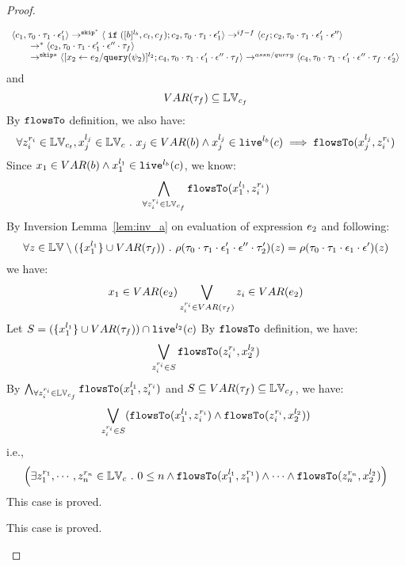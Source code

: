 {\begin{proof}
\begin{subproof}
\begin{enumerate}
\begin{enumerate}
\[
    \begin{array}{l}   
  \langle c_1, \mathtt{\tau}_0 \cdot \mathtt{\tau}_1 \cdot \mathtt{\epsilon}_1' \rangle 
  \rightarrow^{\mathtt{skip}^*} 
  \langle \;\mathtt{if}\; ([b]^{l_b}, c_t, c_f); {c}_2, \mathtt{\tau}_0 \cdot \mathtt{\tau}_1 \cdot \mathtt{\epsilon}_1' \rangle 
  \rightarrow^{if-f} 
  \langle c_f;c_2, \mathtt{\tau}_0 \cdot \mathtt{\tau}_1 \cdot \mathtt{\epsilon}_1' \cdot \mathtt{\epsilon}'' \rangle 
  \\
  \qquad \rightarrow^{*} 
  \langle c_2, 
  \mathtt{\tau}_0 \cdot \mathtt{\tau}_1 \cdot \mathtt{\epsilon}_1' \cdot \mathtt{\epsilon}'' \cdot \mathtt{\tau}_f \rangle
  \\
  \qquad \rightarrow^{\mathtt{skip}*} 
  \langle [\mathrel{ {x}_2 \leftarrow e_2 / {\tt query}(\psi_2) }]^{l_2};{c}_4, 
  \mathtt{\tau}_0 \cdot \mathtt{\tau}_1 \cdot \mathtt{\epsilon}_1' \cdot \mathtt{\epsilon}'' \cdot \mathtt{\tau}_f \rangle
  \rightarrow^{assn/query} 
  \langle {c}_4,  \mathtt{\tau}_0 \cdot \mathtt{\tau}_1 \cdot \mathtt{\epsilon}_1' \cdot \mathtt{\epsilon}'' \cdot \mathtt{\tau}_f \cdot \mathtt{\epsilon}_2' \rangle 
\end{array}
\]
and 
\[
  VAR{(\mathtt{\tau}_f)} \subseteq \mathbb{LV}_{c_f}
\]
%
By $\mathtt{flowsTo}$ definition, we also have:
\[
  \forall z_i^{r_i} \in \mathbb{LV}_{c_t},  x_j^{l_j} \in \mathbb{LV}_c ~.~ 
  x_j \in VAR(b) \land x_j^{l_j} \in \mathtt{live}^{l_b}(c) \implies
  \mathtt{flowsTo}(x_j^{l_j}, z_i^{r_i})
\]
Since $x_1 \in VAR(b) \land x_1^{l_1} \in \mathtt{live}^{l_b}(c)$, we know: 
\[
  \bigwedge_{\forall z_i^{r_i} \in \mathbb{LV}_{c_f}}
  \mathtt{flowsTo}(x_1^{l_1}, z_i^{r_i})
\]
%
By Inversion Lemma~\ref{lem:inv_a} on evaluation of expression $e_2$ and following: 
\[
  \forall z \in \mathbb{LV} \setminus (\{x_1^{l_1}\} \cup VAR{(\mathtt{\tau}_f)}) ~.~
  \rho(\mathtt{\tau}_0 \cdot \mathtt{\tau}_1 \cdot \mathtt{\epsilon}_1'\cdot \mathtt{\epsilon}'' \cdot \mathtt{\tau}_2')(z) 
  = \rho(\mathtt{\tau}_0 \cdot \mathtt{\tau}_1 \cdot \mathtt{\epsilon}_1\cdot \mathtt{\epsilon}')(z)
\]
%
we have:
\[
  x_1 \in VAR(e_2) \bigvee_{z_i^{r_i} \in VAR{(\mathtt{\tau}_f)}} z_i \in VAR(e_2)
\]
%
Let $S = (\{x_1^{l_1}\} \cup VAR{(\mathtt{\tau}_f)}) \cap \mathtt{live}^{l_2}(c) $
%
By $\mathtt{flowsTo}$ definition, we have:
\[
   \bigvee_{z_i^{r_i} \in S}  \mathtt{flowsTo}(z_i^{r_i}, x_2^{l_2})
\]
By $ \bigwedge_{\forall z_i^{r_i} \in \mathbb{LV}_{c_f}} \mathtt{flowsTo}(x_1^{l_1}, z_i^{r_i})$ and $S \subseteq VAR{(\mathtt{\tau}_f)} \subseteq \mathbb{LV}_{c_f}$, we have:
\[
\bigvee_{z_i^{r_i} \in S} 
(\mathtt{flowsTo}(x_1^{l_1}, z_i^{r_i}) \land \mathtt{flowsTo}(z_i^{r_i}, x_2^{l_2}))
\]
%
i.e.,
\[
\Big(\exists z_1^{r_1}, \cdots, z_n^{r_n} \in \mathbb{LV}_{{c}} ~.~ 0 \leq n 
 \land \mathtt{flowsTo}(x_1^{l_1}, z_1^{r_1}) \land \cdots \land \mathtt{flowsTo}(z_n^{r_n}, {x}_2^{l_2}) \Big)
\]
%
This case is proved.
\end{enumerate}
%
\end{enumerate}
%
This case is proved.

\end{subproof}
\end{proof}}
